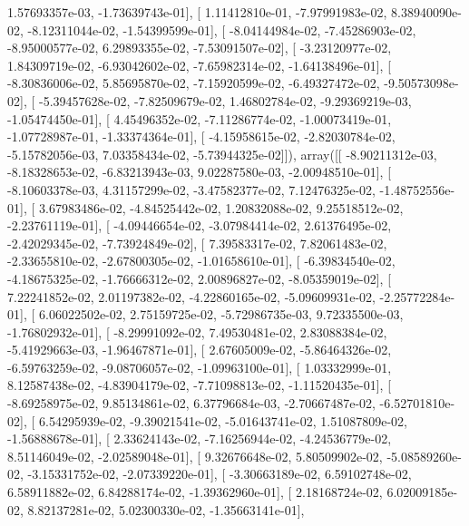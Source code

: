 \documentclass{article}
\begin{document}
          1.57693357e-03,  -1.73639743e-01],
       [  1.11412810e-01,  -7.97991983e-02,   8.38940090e-02,
         -8.12311044e-02,  -1.54399599e-01],
       [ -8.04144984e-02,  -7.45286903e-02,  -8.95000577e-02,
          6.29893355e-02,  -7.53091507e-02],
       [ -3.23120977e-02,   1.84309719e-02,  -6.93042602e-02,
         -7.65982314e-02,  -1.64138496e-01],
       [ -8.30836006e-02,   5.85695870e-02,  -7.15920599e-02,
         -6.49327472e-02,  -9.50573098e-02],
       [ -5.39457628e-02,  -7.82509679e-02,   1.46802784e-02,
         -9.29369219e-03,  -1.05474450e-01],
       [  4.45496352e-02,  -7.11286774e-02,  -1.00073419e-01,
         -1.07728987e-01,  -1.33374364e-01],
       [ -4.15958615e-02,  -2.82030784e-02,  -5.15782056e-03,
          7.03358434e-02,  -5.73944325e-02]]), array([[ -8.90211312e-03,  -8.18328653e-02,  -6.83213943e-03,
          9.02287580e-03,  -2.00948510e-01],
       [ -8.10603378e-03,   4.31157299e-02,  -3.47582377e-02,
          7.12476325e-02,  -1.48752556e-01],
       [  3.67983486e-02,  -4.84525442e-02,   1.20832088e-02,
          9.25518512e-02,  -2.23761119e-01],
       [ -4.09446654e-02,  -3.07984414e-02,   2.61376495e-02,
         -2.42029345e-02,  -7.73924849e-02],
       [  7.39583317e-02,   7.82061483e-02,  -2.33655810e-02,
         -2.67800305e-02,  -1.01658610e-01],
       [ -6.39834540e-02,  -4.18675325e-02,  -1.76666312e-02,
          2.00896827e-02,  -8.05359019e-02],
       [  7.22241852e-02,   2.01197382e-02,  -4.22860165e-02,
         -5.09609931e-02,  -2.25772284e-01],
       [  6.06022502e-02,   2.75159725e-02,  -5.72986735e-03,
          9.72335500e-03,  -1.76802932e-01],
       [ -8.29991092e-02,   7.49530481e-02,   2.83088384e-02,
         -5.41929663e-03,  -1.96467871e-01],
       [  2.67605009e-02,  -5.86464326e-02,  -6.59763259e-02,
         -9.08706057e-02,  -1.09963100e-01],
       [  1.03332999e-01,   8.12587438e-02,  -4.83904179e-02,
         -7.71098813e-02,  -1.11520435e-01],
       [ -8.69258975e-02,   9.85134861e-02,   6.37796684e-03,
         -2.70667487e-02,  -6.52701810e-02],
       [  6.54295939e-02,  -9.39021541e-02,  -5.01643741e-02,
          1.51087809e-02,  -1.56888678e-01],
       [  2.33624143e-02,  -7.16256944e-02,  -4.24536779e-02,
          8.51146049e-02,  -2.02589048e-01],
       [  9.32676648e-02,   5.80509902e-02,  -5.08589260e-02,
         -3.15331752e-02,  -2.07339220e-01],
       [ -3.30663189e-02,   6.59102748e-02,   6.58911882e-02,
          6.84288174e-02,  -1.39362960e-01],
       [  2.18168724e-02,   6.02009185e-02,   8.82137281e-02,
          5.02300330e-02,  -1.35663141e-01],
\end{document}
